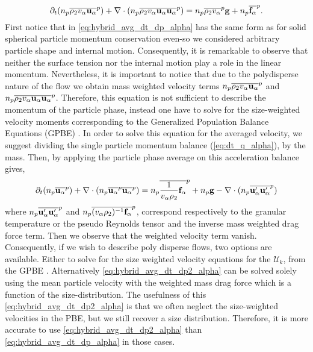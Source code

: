 \begin{equation}
    \partial_t (n_p\overline{\rho_2 v_\alpha\textbf{u}_\alpha}^{p})
    + \mathbf{\nabla} \cdot(n_p\overline{\rho_2 v_\alpha \textbf{u}_\alpha \textbf{u}_\alpha }^{p})
    = n_p\overline{\rho_2 v_\alpha}^{p}\textbf{g}
    + n_p\overline{\textbf{f}_\alpha}^{p}.
    \label{eq:hybrid_avg_dt_dp_alpha}\\
\end{equation}
First notice that in \ref{eq:hybrid_avg_dt_dp_alpha} has the same form as for solid spherical particle momentum conservation \citep{jackson1997locally} even-so we considered arbitrary particle shape and internal motion. 
Consequently, it is remarkable to observe that neither the surface tension nor the internal motion play a role in the linear momentum. 
Nevertheless, it is important to notice that due to the polydisperse nature of the flow we obtain mass weighted velocity terms $n_p\overline{\rho_2 v_\alpha\textbf{u}_\alpha}^{p}$ and $n_p\overline{\rho_2 v_\alpha\textbf{u}_\alpha\textbf{u}_\alpha}^{p}$. 
Therefore, this equation is not sufficient to describe the momentum of the particle phase, instead one have to solve for the size-weighted velocity moments corresponding to the Generalized Population Balance Equations (GPBE)  \citep{fox2023generalized}. 
In order to solve this equation for the averaged velocity, we suggest dividing the single particle momentum balance (\ref{eq:dt_q_alpha}), by the mass. 
Then, by applying the particle phase average on this acceleration balance gives, 
\begin{equation}
    \partial_t (n_p\overline{\textbf{u}_\alpha}^{p})
    + \mathbf{\nabla} \cdot(n_p\overline{\textbf{u}_\alpha}^{p}\overline{ \textbf{u}_\alpha }^{p})
    = 
    n_p\overline{\frac{1}{v_\alpha\rho_2}\textbf{f}_\alpha}^{p}
    + n_p \textbf{g}
    - \mathbf{\nabla} \cdot(n_p\overline{\textbf{u}'_\alpha \textbf{u}'_\alpha }^{p})
    \label{eq:hybrid_avg_dt_dp2_alpha}
\end{equation}
where $n_p\overline{\textbf{u}'_\alpha \textbf{u}'_\alpha }^{p}$ and $n_p\overline{(v_\alpha\rho_2)^{-1} \textbf{f}_\alpha }^{p}$, correspond respectively to the granular temperature or the pseudo Reynolds tensor \citep{jackson1997locally} and the inverse mass weighted drag force term. 
Then we observe that the weighted velocity term vanish. 
Consequently, if we wish to describe poly disperse flows, two options are available. 
Either to solve for the size weighted velocity equations for the $\mathcal{U}_k$, from the GPBE \citet{fox2023generalized,marchisio2013computational}.
Alternatively \ref{eq:hybrid_avg_dt_dp2_alpha} can be solved solely using the mean particle velocity with the weighted mass drag force which is a function of the size-distribution.  
The usefulness of this \ref{eq:hybrid_avg_dt_dp2_alpha} is that we often neglect the size-weighted velocities in the PBE, but we still recover a size distribution. 
Therefore, it is more accurate to use \ref{eq:hybrid_avg_dt_dp2_alpha} than \ref{eq:hybrid_avg_dt_dp_alpha} in those cases. 
 

